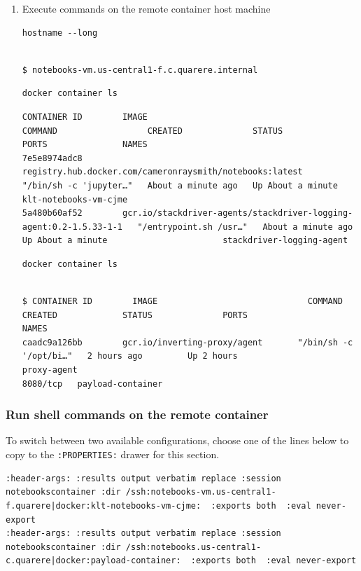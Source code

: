 \documentclass[11pt]{article}
\begin{document}
\begin{enumerate}
\begin{enumerate}
\item Execute commands on the remote container host machine
\label{sec:org0ce9047}
\begin{verbatim}
hostname --long
\end{verbatim}

\begin{verbatim}

$ notebooks-vm.us-central1-f.c.quarere.internal
\end{verbatim}


\begin{verbatim}
docker container ls
\end{verbatim}

\begin{verbatim}
CONTAINER ID        IMAGE                                                                COMMAND                  CREATED              STATUS              PORTS               NAMES
7e5e8974adc8        registry.hub.docker.com/cameronraysmith/notebooks:latest             "/bin/sh -c 'jupyter…"   About a minute ago   Up About a minute                       klt-notebooks-vm-cjme
5a480b60af52        gcr.io/stackdriver-agents/stackdriver-logging-agent:0.2-1.5.33-1-1   "/entrypoint.sh /usr…"   About a minute ago   Up About a minute                       stackdriver-logging-agent
\end{verbatim}


\begin{verbatim}
docker container ls
\end{verbatim}

\begin{verbatim}

$ CONTAINER ID        IMAGE                              COMMAND                  CREATED             STATUS              PORTS                      NAMES
caadc9a126bb        gcr.io/inverting-proxy/agent       "/bin/sh -c '/opt/bi…"   2 hours ago         Up 2 hours                                     proxy-agent
8080/tcp   payload-container
\end{verbatim}
\end{enumerate}
\end{enumerate}

\subsubsection{Run shell commands on the remote container}
\label{sec:org422cf79}
To switch between two available configurations, choose one of the lines below to copy to the \texttt{:PROPERTIES:} drawer for this section.
\begin{verbatim}
:header-args: :results output verbatim replace :session notebookscontainer :dir /ssh:notebooks-vm.us-central1-f.quarere|docker:klt-notebooks-vm-cjme:  :exports both  :eval never-export
:header-args: :results output verbatim replace :session notebookscontainer :dir /ssh:notebooks.us-central1-c.quarere|docker:payload-container:  :exports both  :eval never-export
\end{verbatim}
\end{document}
